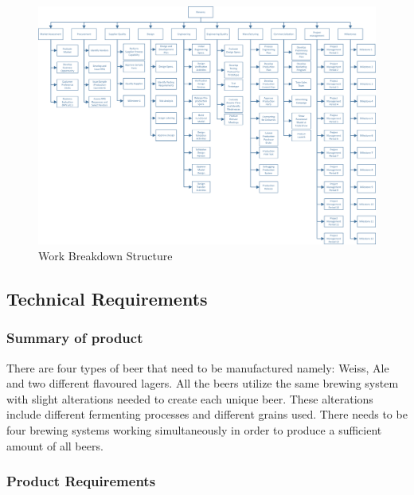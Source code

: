\begin{figure}[!htb]
\centering
\includegraphics[scale=0.65,angle=90,origin=c]{WBS.png}
%
\caption{Work Breakdown Structure}
\label{fig:wbs}
\end{figure}


\subsection{Technical Requirements}
\subsubsection{Summary of product}

There are four types of beer that need to be manufactured namely: Weiss, Ale and two different flavoured lagers. All the beers utilize the same brewing system with slight alterations needed to create each unique beer. These alterations include different fermenting processes and different grains used. There needs to be four brewing systems working simultaneously in order to produce a sufficient amount of all beers.

\subsubsection{Product Requirements}

